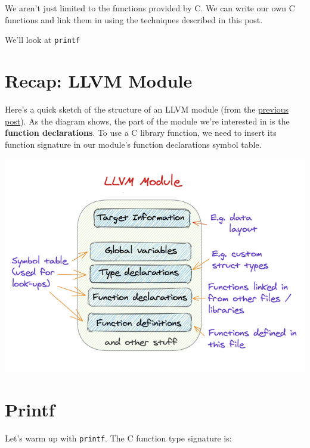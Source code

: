 We aren't just limited to the functions provided by C. We can write our
own C functions and link them in using the techniques described in this
post.

We'll look at \texttt{printf}

\hypertarget{recap-llvm-module}{%
\section{\texorpdfstring{\protect\hyperlink{recap-llvm-module}{}Recap:
LLVM Module}{Recap: LLVM Module}}\label{recap-llvm-module}}

Here's a quick sketch of the structure of an LLVM module (from the
\href{https://mukulrathi.com/create-your-own-programming-language/llvm-ir-cpp-api-tutorial/}{previous
post}). As the diagram shows, the part of the module we're interested in
is the \textbf{function declarations}. To use a C library function, we
need to insert its function signature in our module's function
declarations symbol table.

{
\href{https://mukulrathi.com/static/e21edb9623d8fb7bc23f57db23b93cf8/cad61/module.png}{{}
\includegraphics[width=\linewidth]{09_files/module.png}} }

\hypertarget{printf}{%
\section{\texorpdfstring{\protect\hyperlink{printf}{}Printf}{Printf}}\label{printf}}

Let's warm up with \texttt{printf}. The C function type signature is:


